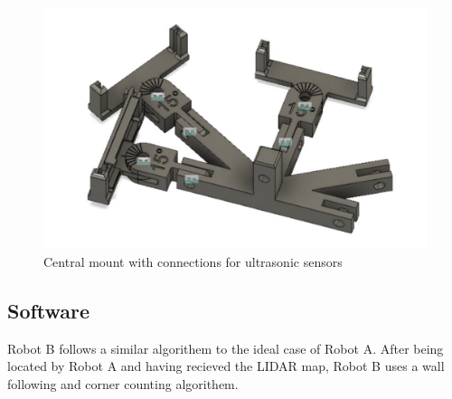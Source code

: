 \documentclass[11pt]{article}
\begin{document}
	\begin{figure}[h!]
		\centering
		\includegraphics[scale=0.5]{central_mount_conns}
		\caption{Central mount with connections for ultrasonic sensors}
	\end{figure}

	\pagebreak
	
	\subsection{Software}
	Robot B follows a similar algorithem to the ideal case of Robot A. After being located by Robot A and having recieved the LIDAR map, Robot B uses a wall following and corner counting algorithem.
	
\end{document}
